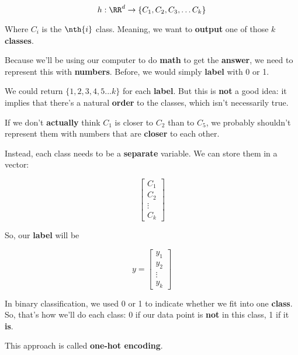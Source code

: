         \begin{equation*}
            h: \RR^d \rightarrow \{C_1, C_2, C_3, \dots C_k\}
        \end{equation*}
        
        Where $C_i$ is the $\nth{i}$ class. Meaning, we want to \textbf{output} one of those $k$ \textbf{classes}.
        
        Because we'll be using our computer to do \textbf{math} to get the \textbf{answer}, we need to represent this with \textbf{numbers}. Before, we would simply \textbf{label} with 0 or 1. 
        
        We could return $\{1,2,3,4,5...k\}$ for each \textbf{label}. But this is \textbf{not} a good idea: it implies that there's a natural \textbf{order} to the classes, which isn't necessarily true.
        
        If we don't \textbf{actually} think $C_1$ is closer to $C_2$ than to $C_5$, we probably shouldn't represent them with numbers that are \textbf{closer} to each other.
        
        Instead, each class needs to be a \textbf{separate} variable. We can store them in a vector:
        
        \begin{equation}
            \begin{bmatrix}
              C_1\\C_2\\ \vdots \\ C_k
            \end{bmatrix}
        \end{equation}
        
        So, our \textbf{label} will be
        
        \begin{equation}
            y=
            \begin{bmatrix}
              y_1\\y_2\\ \vdots \\ y_k
            \end{bmatrix}
        \end{equation}
        
        In binary classification, we used 0 or 1 to indicate whether we fit into one \textbf{class}. So, that's how we'll do each class: 0 if our data point is \textbf{not} in this class, 1 if it \textbf{is}.
        
        This approach is called \textbf{one-hot encoding}.\\
        
